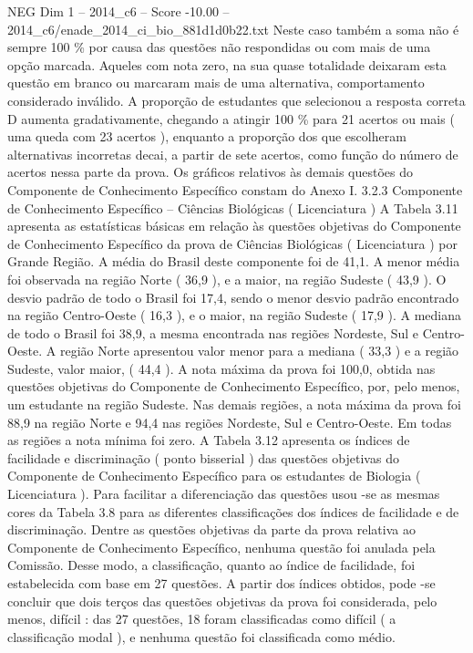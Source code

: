 \begin{textsample}{NEG Dim 1 – 2014\_c6 – Score -10.00 – 2014\_c6/enade\_2014\_ci\_bio\_881d1d0b22.txt}
Neste caso também a soma não é sempre 100 \% por causa das questões não respondidas ou com mais de uma opção marcada.
Aqueles com nota zero, na sua quase totalidade deixaram esta questão em branco ou marcaram mais de uma alternativa, comportamento considerado inválido.
A proporção de estudantes que selecionou a resposta correta D aumenta gradativamente, chegando a atingir 100 \% para 21 acertos ou mais ( uma queda com 23 acertos ), enquanto a proporção dos que escolheram alternativas incorretas decai, a partir de sete acertos, como função do número de acertos nessa parte da prova.
Os gráficos relativos às demais questões do Componente de Conhecimento Específico constam do Anexo I. 3.2.3 Componente de Conhecimento Específico – Ciências Biológicas ( Licenciatura ) A Tabela 3.11 apresenta as estatísticas básicas em relação às questões objetivas do Componente de Conhecimento Específico da prova de Ciências Biológicas ( Licenciatura ) por Grande Região.
A média do Brasil deste componente foi de 41,1.
A menor média foi observada na região Norte ( 36,9 ), e a maior, na região Sudeste ( 43,9 ).
O desvio padrão de todo o Brasil foi 17,4, sendo o menor desvio padrão encontrado na região Centro-Oeste ( 16,3 ), e o maior, na região Sudeste ( 17,9 ).
A mediana de todo o Brasil foi 38,9, a mesma encontrada nas regiões Nordeste, Sul e Centro-Oeste.
A região Norte apresentou valor menor para a mediana ( 33,3 ) e a região Sudeste, valor maior, ( 44,4 ).
A nota máxima da prova foi 100,0, obtida nas questões objetivas do Componente de Conhecimento Específico, por, pelo menos, um estudante na região Sudeste.
Nas demais regiões, a nota máxima da prova foi 88,9 na região Norte e 94,4 nas regiões Nordeste, Sul e Centro-Oeste.
Em todas as regiões a nota mínima foi zero.
A Tabela 3.12 apresenta os índices de facilidade e discriminação ( ponto bisserial ) das questões objetivas do Componente de Conhecimento Específico para os estudantes de Biologia ( Licenciatura ).
Para facilitar a diferenciação das questões usou -se as mesmas cores da Tabela 3.8 para as diferentes classificações dos índices de facilidade e de discriminação.
Dentre as questões objetivas da parte da prova relativa ao Componente de Conhecimento Específico, nenhuma questão foi anulada pela Comissão.
Desse modo, a classificação, quanto ao índice de facilidade, foi estabelecida com base em 27 questões.
A partir dos índices obtidos, pode -se concluir que dois terços das questões objetivas da prova foi considerada, pelo menos, difícil : das 27 questões, 18 foram classificadas como difícil ( a classificação modal ), e nenhuma questão foi classificada como médio.

\end{textsample}

